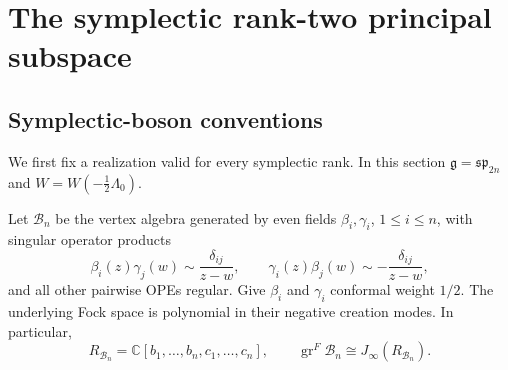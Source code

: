 \documentclass[11pt]{amsart}
\theoremstyle{definition}
\theoremstyle{remark}
\newcommand{\C}{\mathbb C}
\newcommand{\g}{\mathfrak g}
\newcommand{\J}{J_\infty}
\newcommand{\spalg}{\mathfrak{sp}}
\newcommand{\soalg}{\mathfrak{so}}
\DeclareMathOperator{\gr}{gr}
\newcommand{\B}{\mathcal B}
\begin{document}

\section{The symplectic rank-two principal subspace}\label{sec:main}
\subsection{Symplectic-boson conventions}\label{sec:free}
We first fix a realization valid for every symplectic rank. In this
section $\g=\spalg_{2n}$ and $W=W(-\frac12\Lambda_0)$.

Let $\B_n$ be the vertex algebra generated by even fields
$\beta_i,\gamma_i$, $1\leq i\leq n$, with singular operator products
\begin{equation}\label{eq:ope}
 \beta_i(z)\gamma_j(w)\sim\frac{\delta_{ij}}{z-w},\qquad
 \gamma_i(z)\beta_j(w)\sim-\frac{\delta_{ij}}{z-w},
\end{equation}
and all other pairwise OPEs regular. Give $\beta_i$ and $\gamma_i$
conformal weight $1/2$. The underlying Fock space is polynomial in
their negative creation modes. In particular,
\begin{equation}\label{eq:free-gr}
 R_{\B_n}=\C[b_1,\ldots,b_n,c_1,\ldots,c_n],\qquad
 \gr^F\B_n\cong\J(R_{\B_n}).
\end{equation}
\end{document}
